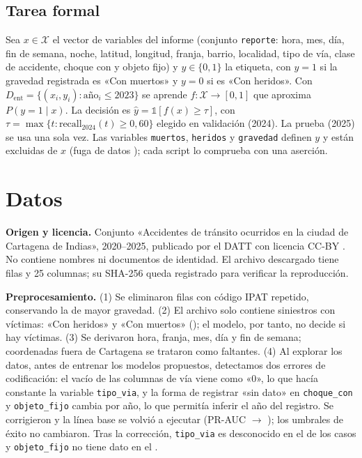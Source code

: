 \documentclass[conference]{IEEEtran}
\begin{document}
\subsection{Tarea formal}
Sea $x\in\mathcal{X}$ el vector de variables del informe (conjunto \texttt{reporte}: hora, mes, día, fin de semana, noche, latitud,
longitud, franja, barrio, localidad, tipo de vía, clase de accidente, choque con y objeto fijo) y $y\in\{0,1\}$ la etiqueta, con
$y=1$ si la gravedad registrada es «Con muertos» y $y=0$ si es «Con heridos». Con
$D_{\text{ent}}=\{(x_i,y_i): \text{año}_i\leq 2023\}$ se aprende $f:\mathcal{X}\to[0,1]$ que aproxima $P(y=1\mid x)$. La decisión
es $\hat y=\mathbb{1}[f(x)\geq\tau]$, con
$\tau=\max\{t: \text{recall}_{2024}(t)\geq 0{,}60\}$ elegido en validación (2024). La prueba (2025) se usa una sola vez.
Las variables \texttt{muertos}, \texttt{heridos} y \texttt{gravedad} definen $y$ y están excluidas de $x$ (fuga de datos
\cite{kaufman2012leakage}); cada script lo comprueba con una aserción.

\section{Datos}
\textbf{Origen y licencia.} Conjunto «Accidentes de tránsito ocurridos en la ciudad de Cartagena de Indias», 2020--2025, publicado
por el DATT con licencia CC-BY \cite{datt2026dataset}. No contiene nombres ni documentos de identidad. El archivo descargado
tiene \CifraNRaw{} filas y 25 columnas; su SHA-256 queda registrado para verificar la reproducción.

\textbf{Preprocesamiento.} (1) Se eliminaron \CifraNDup{} filas con código IPAT repetido, conservando la de mayor gravedad.
(2) El archivo solo contiene siniestros con víctimas: \CifraNHeridos{} «Con heridos» y \CifraNFatal{} «Con muertos»
(\CifraPctFatal{}); el modelo, por tanto, no decide si hay víctimas. (3) Se derivaron hora, franja, mes, día y fin de semana;
\CifraCoordFuera{} coordenadas fuera de Cartagena se trataron como faltantes. (4) Al explorar los datos, antes de entrenar los
modelos propuestos, detectamos dos errores de codificación: el vacío de las columnas de vía viene como «0», lo que hacía constante
la variable \texttt{tipo\_via}, y la forma de registrar «sin dato» en \texttt{choque\_con} y \texttt{objeto\_fijo} cambia por año,
lo que permitía inferir el año del registro. Se corrigieron y la línea base se volvió a ejecutar (PR-AUC \CifraBasePRAntes{}
$\to$ \CifraBasePR{}); los umbrales de éxito no cambiaron. Tras la corrección, \texttt{tipo\_via} es desconocido en el
\CifraTipoViaDesconocido{} de los casos y \texttt{objeto\_fijo} no tiene dato en el \CifraObjetoSinDato{}.
\end{document}
